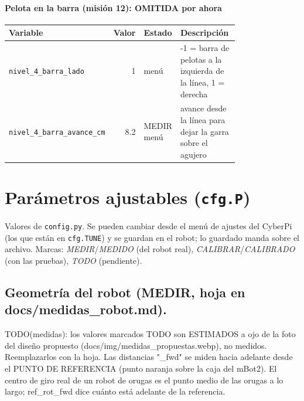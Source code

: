 \paragraph{Pelota en la barra (misión 12): OMITIDA por ahora}
\begin{longtable}{@{}p{0.36\linewidth}rlp{0.42\linewidth}@{}}\toprule
\textbf{Variable} & \textbf{Valor} & \textbf{Estado} & \textbf{Descripci\'on} \\\midrule\endhead
\texttt{nivel\_\allowbreak{}4\_\allowbreak{}barra\_\allowbreak{}lado} & 1 & menú & -1 = barra de pelotas a la izquierda de la línea, 1 = derecha \\
\texttt{nivel\_\allowbreak{}4\_\allowbreak{}barra\_\allowbreak{}avance\_\allowbreak{}cm} & 8.2 & MEDIR menú & avance desde la línea para dejar la garra sobre el agujero \\
\bottomrule\end{longtable}
\section{Par\'ametros ajustables (\texttt{cfg.P})}
Valores de \texttt{config.py}. Se pueden cambiar desde el men\'u de ajustes del CyberPi (los que est\'an en \texttt{cfg.TUNE}) y se guardan en el robot; lo guardado manda sobre el archivo. Marcas: \emph{MEDIR}/\emph{MEDIDO} (del robot real), \emph{CALIBRAR}/\emph{CALIBRADO} (con las pruebas), \emph{TODO} (pendiente).
\subsection*{Geometría del robot (MEDIR, hoja en docs/medidas\_robot.md).}
TODO(medidas): los valores marcados TODO son ESTIMADOS a ojo de la foto del diseño propuesto (docs/img/medidas\_propuestas.webp), no medidos. Reemplazarlos con la hoja. Las distancias "\_fwd" se miden hacia adelante desde el PUNTO DE REFERENCIA (punto naranja sobre la caja del mBot2). El centro de giro real de un robot de orugas es el punto medio de las orugas a lo largo; ref\_rot\_fwd dice cuánto está adelante de la referencia.

